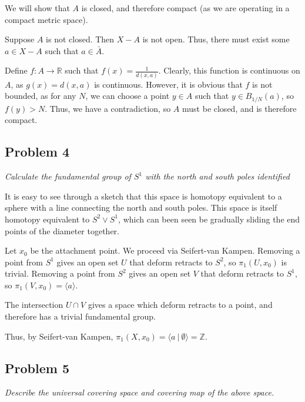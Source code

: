 \documentclass[10pt, oneside]{amsart}
\begin{document}
    We will show that $A$ is closed, and therefore compact (as we are operating in a compact metric space).
    \newline

    Suppose $A$ is not closed. Then $X - A$ is not open. Thus, there must exist some $a \in X - A$ such that $a \in \bar{A}$.
    \newline

    Define $f : A \rightarrow \mathbb{R}$ such that $f(x) = \frac{1}{d(x, a)}$. Clearly, this function is continuous on $A$, as $g(x) = d(x, a)$ is continuous. However, it is obvious that $f$ is not bounded, as for any $N$, we can choose
    a point $y \in A$ such that $y \in B_{1/N}(a)$, so $f(y) > N$. Thus, we have a contradiction, so $A$ must be closed, and is therefore compact.

    \hrulefill

    \subsection{Problem 4} \textit{Calculate the fundamental group of $S^{1}$ with the north and south poles identified}
    \newline

    It is easy to see through a sketch that this space is homotopy equivalent to a sphere with a line connecting the north and south poles. This space is itself homotopy equivalent to
    $S^{2} \vee S^{1}$, which can been seen be gradually sliding the end points of the diameter together.
    \newline
   
    Let $x_0$ be the attachment point. We proceed via Seifert-van Kampen. Removing a point from $S^{1}$ gives an open set $U$ that deform retracts to $S^{2}$, so $\pi_1(U, x_0)$ is trivial.
    Removing a point from $S^{2}$ gives an open set $V$ that deform retracts to $S^{1}$, so $\pi_1(V, x_0) = \langle a \rangle$.
    \newline

    The intersection $U \cap V$ gives a space which deform retracts to a point, and therefore has a trivial fundamental group.
    \newline

    Thus, by Seifert-van Kampen, $\pi_1(X, x_0) = \langle a \ | \ \emptyset \rangle = \mathbb{Z}$.

    \hrulefill

    \subsection{Problem 5} \textit{Describe the universal covering space and covering map of the above space.}
    \newline
\end{document}
